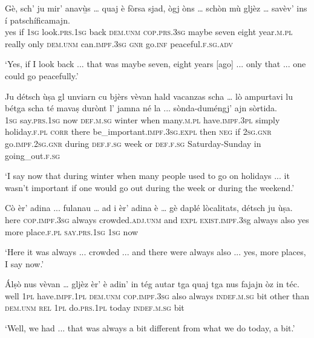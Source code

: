\begin{linenumbers}
	\gll Gè, sch’ ju mir’ anavù̱s … quaj è fòrsa sjad, ògj òns … schòn mù gljèz … savèv’ ins í patschíficamajn.   \\
	yes if \textsc{1sg} look.\textsc{prs.1sg} back {} \textsc{dem.unm} \textsc{cop.prs.3sg} maybe seven eight year.\textsc{m.pl} {} really only \textsc{dem.unm} {} can.\textsc{impf.3sg} \textsc{gnr} go.\textsc{inf} peaceful.\textsc{f.sg.adv}\\
\end{linenumbers}
\medskip
\glt `Yes, if I look back ... that was maybe seven, eight years [ago] ... only that ... one could go peacefully.'
\medskip

\begin{linenumbers}
	\gll Ju détsch ùṣa gl unviarn cu bjèrs vèvan hald vacanzas scha … lò ampurtavi lu bétga scha té mavaṣ durònt l’ jamna né la ... sònda-duméngj’ ajn sòrtida.   \\
	\textsc{1sg} say.\textsc{prs.1sg} now \textsc{def.m.sg} winter when many.\textsc{m.pl} have.\textsc{impf.3pl} simply holiday.\textsc{f.pl} \textsc{corr} {} there be\_important.\textsc{impf.3sg.expl} then \textsc{neg} if \textsc{2sg.gnr} go.\textsc{impf.2sg.gnr} during \textsc{def.f.sg} week or \textsc{def.f.sg} {} Saturday-Sunday in going\_out.\textsc{f.sg}\\
\end{linenumbers}
\medskip
\glt `I say now that during winter when many people used to go on holidays ... it wasn't important if one would go out during the week or during the weekend.'
\medskip

\begin{linenumbers}
	\gll  Cò èr’ adina ... fulanau … ad i èr’ adina è … gè daplé lòcalitats, détsch ju ùṣa.  \\
	here \textsc{cop.impf.3sg} always {} crowded.\textsc{adj.unm} {} and \textsc{expl} \textsc{exist.impf.3s}g always also {} yes more place.\textsc{f.pl} \textsc{say.prs.1sg} \textsc{1sg} now \\
\end{linenumbers}
\medskip
\glt `Here it was always ... crowded ... and there were always also ... yes, more places, I say now.'
\medskip

\begin{linenumbers}
	\gll  Álṣò nus vèvan … gljèz èr’ è adin’ in tég autar tga quaj tga nus fajajn òz in téc.  \\
	well \textsc{1pl} have.\textsc{impf.1pl} {} \textsc{dem.unm} \textsc{cop.impf.3sg} also always \textsc{indef.m.sg} bit other than \textsc{dem.unm} \textsc{rel} \textsc{1pl} do.\textsc{prs.1pl} today \textsc{indef.m.sg} bit\\
\end{linenumbers}
\medskip
\glt `Well, we had ... that was always a bit different from what we do today, a bit.'
\medskip

